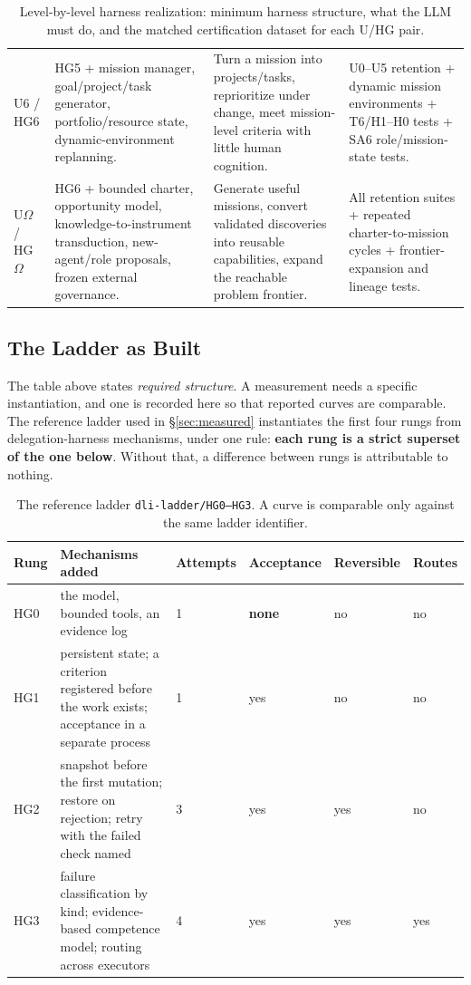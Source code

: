 \documentclass[11pt]{article}
\theoremstyle{definition}
\newcommand{\Om}{\ensuremath{\Omega}}
\begin{document}
\begin{table}[!htbp]
\begin{tabularx}{\textwidth}{@{}p{}ZZZ@{}}
U6 / HG6 & HG5 + mission manager, goal/project/task generator, portfolio/resource state, dynamic-environment replanning. & Turn a mission into projects/tasks, reprioritize under change, meet mission-level criteria with little human cognition. & U0--U5 retention + dynamic mission environments + T6/H1--H0 tests + SA6 role/mission-state tests. \\
U\Om{} / HG\Om{} & HG6 + bounded charter, opportunity model, knowledge-to-instrument transduction, new-agent/role proposals, frozen external governance. & Generate useful missions, convert validated discoveries into reusable capabilities, expand the reachable problem frontier. & All retention suites + repeated charter-to-mission cycles + frontier-expansion and lineage tests. \\
\bottomrule
\end{tabularx}
\caption{Level-by-level harness realization: minimum harness structure, what the LLM must do, and the matched certification dataset for each U/HG pair.}
\label{tab:levelbylevel}
\end{table}

\subsection{The Ladder as Built}\label{sec:built}

The table above states \emph{required structure}. A measurement needs a specific instantiation, and one is recorded here so that reported curves are comparable. The reference ladder used in \S\ref{sec:measured} instantiates the first four rungs from delegation-harness mechanisms, under one rule: \textbf{each rung is a strict superset of the one below}. Without that, a difference between rungs is attributable to nothing.

\begin{table}[!htbp]
\centering\small
\begin{tabularx}{\textwidth}{@{}lYllll@{}}
\toprule
Rung & Mechanisms added & Attempts & Acceptance & Reversible & Routes \\
\midrule
HG0 & the model, bounded tools, an evidence log & 1 & \textbf{none} & no & no \\
HG1 & persistent state; a criterion registered before the work exists; acceptance in a separate process & 1 & yes & no & no \\
HG2 & snapshot before the first mutation; restore on rejection; retry with the failed check named & 3 & yes & yes & no \\
HG3 & failure classification by kind; evidence-based competence model; routing across executors & 4 & yes & yes & yes \\
\bottomrule
\end{tabularx}
\caption{The reference ladder \texttt{dli-ladder/HG0--HG3}. A curve is comparable only against the same ladder identifier.}
\label{tab:ladder}
\end{table}
\end{document}
